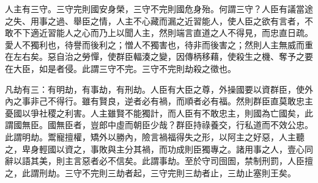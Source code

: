 
\begin{pinyinscope}
人主有三守。三守完則國安身榮，三守不完則國危身殆。何謂三守？人臣有議當途之失、用事之過、舉臣之情，人主不心藏而漏之近習能人，使人臣之欲有言者，不敢不下適近習能人之心而乃上以聞人主，然則端言直道之人不得見，而忠直日疏。愛人不獨利也，待譽而後利之；憎人不獨害也，待非而後害之；然則人主無威而重在左右矣。惡自治之勞憚，使群臣輻湊之變，因傳柄移藉，使殺生之機、奪予之要在大臣，如是者侵。此謂三守不完。三守不完則劫殺之徵也。

凡劫有三：有明劫，有事劫，有刑劫。人臣有大臣之尊，外操國要以資群臣，使外內之事非己不得行。雖有賢良，逆者必有禍，而順者必有福。然則群臣直莫敢忠主憂國以爭社稷之利害。人主雖賢不能獨計，而人臣有不敢忠主，則國為亡國矣，此謂國無臣。國無臣者，豈郎中虛而朝臣少哉？群臣持祿養交，行私道而不效公忠。此謂明劫。鬻寵擅權，矯外以勝內，險言禍福得失之形，以阿主之好惡，人主聽之，卑身輕國以資之，事敗與主分其禍，而功成則臣獨專之。諸用事之人，壹心同辭以語其美，則主言惡者必不信矣。此謂事劫。至於守司囹圄，禁制刑罰，人臣擅之，此謂刑劫。三守不完則三劫者起，三守完則三劫者止，三劫止塞則王矣。


\end{pinyinscope}